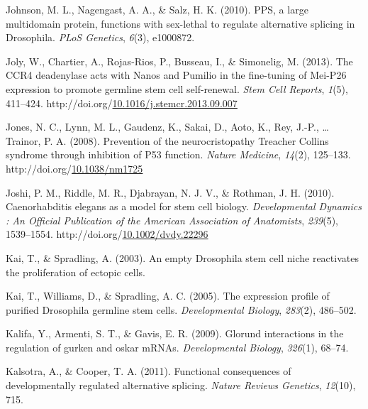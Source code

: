 \documentclass[12pt,oneside]{reedthesis}
\newlength{\cslhangindent}
\newenvironment{CSLReferences}[2] %
 {%
  \setlength{\parindent}{0pt}
  \ifodd #1 \everypar{\setlength{\hangindent}{\cslhangindent}}\ignorespaces\fi
  \ifnum #2 > 0
  \setlength{\parskip}{#2\baselineskip}
  \fi
 }%
 {}
\begin{document}
\begin{CSLReferences}{1}{0}
\leavevmode{}%
Johnson, M. L., Nagengast, A. A., \& Salz, H. K. (2010). {PPS}, a large multidomain protein, functions with sex-lethal to regulate alternative splicing in {Drosophila}. \emph{PLoS Genetics}, \emph{6}(3), e1000872.

\leavevmode{}%
Joly, W., Chartier, A., Rojas-Rios, P., Busseau, I., \& Simonelig, M. (2013). The {CCR4} deadenylase acts with {Nanos} and {Pumilio} in the fine-tuning of {Mei}-{P26} expression to promote germline stem cell self-renewal. \emph{Stem Cell Reports}, \emph{1}(5), 411--424. http://doi.org/\href{https://doi.org/10.1016/j.stemcr.2013.09.007}{10.1016/j.stemcr.2013.09.007}

\leavevmode{}%
Jones, N. C., Lynn, M. L., Gaudenz, K., Sakai, D., Aoto, K., Rey, J.-P., \ldots{} Trainor, P. A. (2008). Prevention of the neurocristopathy {Treacher Collins} syndrome through inhibition of P53 function. \emph{Nature Medicine}, \emph{14}(2), 125--133. http://doi.org/\href{https://doi.org/10.1038/nm1725}{10.1038/nm1725}

\leavevmode{}%
Joshi, P. M., Riddle, M. R., Djabrayan, N. J. V., \& Rothman, J. H. (2010). Caenorhabditis elegans as a model for stem cell biology. \emph{Developmental Dynamics : An Official Publication of the American Association of Anatomists}, \emph{239}(5), 1539--1554. http://doi.org/\href{https://doi.org/10.1002/dvdy.22296}{10.1002/dvdy.22296}

\leavevmode{}%
Kai, T., \& Spradling, A. (2003). An empty {Drosophila} stem cell niche reactivates the proliferation of ectopic cells.

\leavevmode{}%
Kai, T., Williams, D., \& Spradling, A. C. (2005). The expression profile of purified {Drosophila} germline stem cells. \emph{Developmental Biology}, \emph{283}(2), 486--502.

\leavevmode{}%
Kalifa, Y., Armenti, S. T., \& Gavis, E. R. (2009). Glorund interactions in the regulation of gurken and oskar {mRNAs}. \emph{Developmental Biology}, \emph{326}(1), 68--74.

\leavevmode{}%
Kalsotra, A., \& Cooper, T. A. (2011). Functional consequences of developmentally regulated alternative splicing. \emph{Nature Reviews Genetics}, \emph{12}(10), 715.


\end{CSLReferences}
\end{document}
